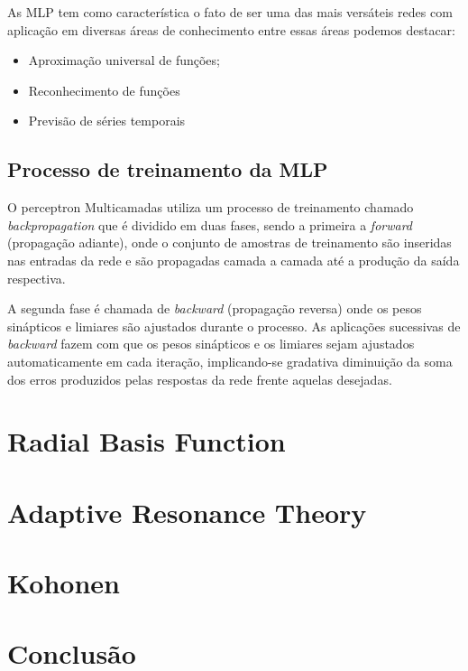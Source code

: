 As MLP tem como característica o fato de ser uma das mais versáteis redes com aplicação em diversas áreas de conhecimento entre essas áreas podemos destacar:

\begin{itemize}
	\item Aproximação universal de funções;
	\item Reconhecimento de funções
	\item Previsão de séries temporais	
\end{itemize}




\subsection{Processo de treinamento da MLP}
\label{sub:processo-de-treinamento-da-mlp}


O perceptron Multicamadas utiliza um processo de treinamento chamado \textit{backpropagation} que é dividido em duas fases, sendo a primeira a \textit{forward} (propagação adiante), onde o conjunto de amostras de treinamento são inseridas nas entradas da rede e são propagadas camada a camada até a produção da saída respectiva.

A segunda fase é chamada de \textit{backward} (propagação reversa) onde os pesos sinápticos e limiares são ajustados durante o processo. As aplicações sucessivas de \textit{backward} fazem com que os pesos sinápticos e os limiares sejam ajustados automaticamente em cada iteração, implicando-se gradativa diminuição da soma dos erros produzidos pelas respostas da rede frente aquelas desejadas.


\section{Radial Basis Function}
\label{sec:radial-basis-function}

\section{Adaptive Resonance Theory}
\label{sec:adaptive-resonance-theory}


\section{Kohonen}
\label{sec:kohonen}


\section{Conclusão}
\label{sec:conclusão}
